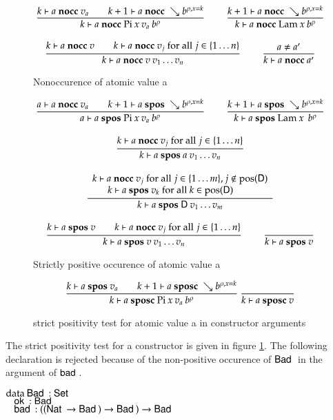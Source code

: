 \begin{figure}[p]
\begin{gather*}
\ \dfrac{k\vdash a\mbox{ \textbf{nocc} }v_a \qquad k+1\vdash a\mbox{ \textbf{nocc} }\searrow b^{\rho,x=k}}{k\vdash a\mbox{ \textbf{nocc} }\mathrm{Pi} \: x \: v_a \: b^{\rho}  }
\qquad
\ \dfrac{k+1\vdash a\mbox{ \textbf{nocc} }\searrow b^{\rho,x=k}}{k\vdash a\mbox{ \textbf{nocc} }\mathrm{Lam} \: x \: b^{\rho}  }
\\[2ex]
\ \dfrac{k\vdash a\mbox{ \textbf{nocc} }v \qquad k\vdash a\mbox{ \textbf{nocc} }v_j \mbox{ for all } j \in \{1 \ldots n \}}{k\vdash a\mbox{ \textbf{nocc} }v \: v_1 \ldots v_n}
\qquad
\ \dfrac{a \neq a'}{k\vdash a\mbox{ \textbf{nocc} }a'}
\end{gather*}
\caption{Nonoccurence of atomic value a}
\end{figure}

\begin{figure}[p]
\begin{gather*}
\ \dfrac{ a\vdash a\mbox{ \textbf{nocc} }v_a \qquad k+1\vdash a\mbox{ \textbf{spos} }\searrow b^{\rho,x=k}}{a\vdash a\mbox{ \textbf{spos} }\mathrm{Pi} \: x \: v_a \: b^{\rho}  }
\qquad
\ \dfrac{k+1\vdash a\mbox{ \textbf{spos} }\searrow b^{\rho,x=k}}{k\vdash a\mbox{ \textbf{spos} }\mathrm{Lam} \: x \: \: b^{\rho}  }
\\[2ex]
\ \dfrac{k\vdash a\mbox{ \textbf{nocc} }v_j \mbox{ for all } j \in \{1 \ldots n \}}{k\vdash a\mbox{ \textbf{spos} }a \: v_1 \ldots v_n}
\\[2ex]
\ \dfrac{\begin{array}[b]{c}k\vdash a\mbox{ \textbf{nocc} }v_j \mbox{ for all } j \in \{ 1 \ldots m\} , j \notin \mbox{pos}(\mathsf{D})\\k\vdash a\mbox{ \textbf{spos} }v_k \mbox{ for all } k \in \mbox{pos}(\mathsf{D}) \qquad\end{array}}{k\vdash a\mbox{ \textbf{spos} }\mathsf{D} \: v_1 \ldots v_m}
\\[2ex]
\ \dfrac{k\vdash a\mbox{ \textbf{spos} }v \qquad k\vdash a\mbox{ \textbf{nocc} }v_j \mbox{ for all } j \in \{1 \ldots n \}}{k\vdash a\mbox{ \textbf{spos} }v \: v_1 \ldots v_n}
\qquad
\ \dfrac{}{k\vdash a\mbox{ \textbf{spos} }v}
\end{gather*}
\caption{Strictly positive occurence of atomic value a}
\end{figure}


\begin{figure}[p]
\label{sposcf}
\begin{gather*}
\ \dfrac{ k\vdash a\mbox{ \textbf{spos} }v_a \qquad k+1\vdash a\mbox{ \textbf{sposc} }\searrow b^{\rho,x=k}}{k\vdash a\mbox{ \textbf{sposc} }\mathrm{Pi} \: x \: v_a \: b^{\rho}  }
\ \dfrac{}{k\vdash a\mbox{ \textbf{sposc} }v}
\end{gather*}
\caption{strict positivity test for atomic value a in constructor arguments}
\end{figure}

The strict positivity test for a constructor is given in figure \ref{sposcf}.
The following declaration is rejected because of the non-positive occurence of $\mathsf{Bad}\:$ in the argument of $\mathsf{bad}\:$.
\begin{bsp}
$\mathrm{data}\: \mathsf{Bad}\: : \mathsf{Set} $ \\
$\hspace*{3mm} \mathsf{ok}\: : \mathsf{Bad}\:$\\
$\hspace*{3mm} \mathsf{bad}\: : ((\mathsf{Nat}\: \rightarrow \mathsf{Bad}\:) \rightarrow \mathsf{Bad}\:) \rightarrow \mathsf{Bad}\:  $
\end{bsp}

